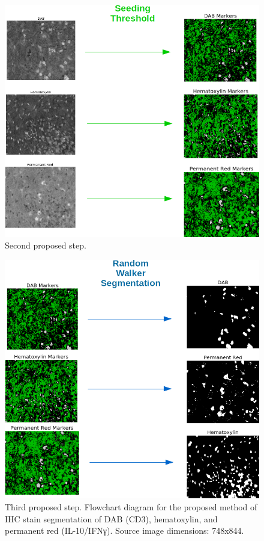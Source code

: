 \documentclass[12pt]{article}
\begin{document}
\begin{figure}[H]
  \includegraphics[width=\linewidth]{7SeedThreshold.png}
  \caption{Second proposed step.}
  \label{fig:SeedThreshold7}
\end{figure}

\begin{figure}[H]
  \includegraphics[width=\linewidth]{8RandomWalkSeg.png}
  \caption{Third proposed step.
  Flowchart diagram for the proposed method of IHC stain segmentation of DAB (CD3), hematoxylin, and permanent red (IL-10/IFNγ). Source image dimensions: 748x844.}
  \label{fig:RandomWalkSeg8}
\end{figure}
\end{document}

